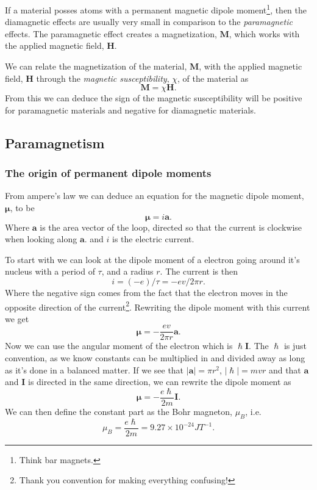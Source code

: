 \documentclass[11pt]{article}
\begin{document}
If a material posses atoms with a permanent magnetic dipole moment\footnote{Think bar magnets.}, then the diamagnetic effects are usually very small in comparison to the \emph{paramagnetic} effects. The paramagnetic effect creates a magnetization, $\mathbf{M}$, which works with the applied magnetic field, $\mathbf{H}$. 

We can relate the magnetization of the material, $\mathbf{M}$, with the applied magnetic field, $\mathbf{H}$ through the \emph{magnetic susceptibility}, $\chi$, of the material as 
\begin{equation}
	\mathbf{M} = \chi \mathbf{H}.
	\label{eq:susceptibility}
\end{equation}
From this we can deduce the sign of the magnetic susceptibility will be positive for paramagnetic materials and negative for diamagnetic materials. 

\subsection{Paramagnetism}
\subsubsection{The origin of permanent dipole moments}
From ampere's law we can deduce an equation for the magnetic dipole moment, $\pmb{\mu}$, to be
\begin{equation}
	\pmb{\mu} = i \pmb{a}.
	\label{eq:amperes-law}
\end{equation}
Where $\pmb{a}$ is the area vector of the loop, directed so that the current is clockwise when looking along $\pmb{a}$. and $i$ is the electric current.

To start with we can look at the dipole moment of a electron going around it's nucleus with a period of $\tau$, and a radius $r$. The current is then 
\begin{equation}
	i = (-e)/\tau = -e v/2\pi r.
\end{equation}
Where the negative sign comes from the fact that the electron moves in the opposite direction of the current\footnote{Thank you convention for making everything confusing!}. Rewriting the dipole moment with this current we get
\begin{equation}
	\pmb{\mu} = - \frac{ev}{2\pi r} \pmb{a}.
\end{equation}
Now we can use the angular moment of the electron which is $\hslash \pmb{I}$. The $\hslash$ is just convention, as we know constants can be multiplied in and divided away as long as it's done in a balanced matter. If we see that $|\pmb{a}| = \pi r^2$, $|\hslash| = mvr$ and that $\pmb{a}$ and $\pmb{I}$ is directed in the same direction, we can rewrite the dipole moment as
\begin{equation}
	\pmb{\mu} = - \frac{e\hslash}{2m} \pmb{I}.
	\label{eq:orbital_momentum}
\end{equation}
We can then define the constant part as the Bohr magneton, $\mu_B$, i.e.
\begin{equation}
	\mu_B = \frac{e\hslash}{2m} = 9.27 \times 10^{-24} J T^{-1}.
\end{equation}
\end{document}
